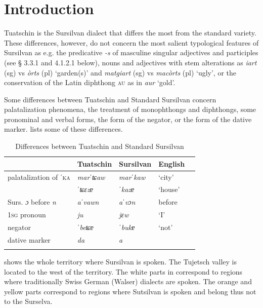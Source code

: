 \chapter{Introduction}
Tuatschin is the Sursilvan dialect that differs the most from the standard variety. These differences, however, do not concern the most salient typological features of Sursilvan as e.g. the predicative \textit{-s} of masculine singular adjectives and participles (see § 3.3.1 and 4.1.2.1 below), nouns and adjectives with stem alterations as \textit{iart} (sg) vs \textit{òrts} (pl) `garden(s)' and \textit{matgiart} (sg) vs \textit{macòrts} (pl) `ugly', or the conservation of the Latin diphthong \textsc{au} as in \textit{aur} `gold'.

Some differences between Tuatschin and Standard Sursilvan concern palatalization phenomena, the treatment of monophthongs and diphthongs, some pronominal and verbal forms, the form of the negator, or the form of the dative marker.  lists some of these differences.


\begin{table}
	\caption{Differences between Tuatschin and Standard Sursilvan}
	\label{difstand}
	\begin{tabular}{lllll}
		\lsptoprule
		& Tuatschin &  Sursilvan & English\\
		\midrule
	palatalization of ˈ\textsc{ka}  & \textit{marˈʨaw} & \textit{marˈkaw} & `city'\\
	& \textit{ˈʨɛzɐ} & \textit{ˈkazɐ} & `house'\\
	Surs. \textit{ɔ} before \textit{n} & \textit{aˈvawn} & \textit{aˈvɔn} & before\\
	\textsc{1sg} pronoun & \textit{ju} & \textit{jɛw} & `I'\\
	negator	& \textit{ˈbeʨɐ} &  \textit{ˈbukɐ} & `not'\\
	dative marker & \textit{da} &  \textit{a}\\
				\lspbottomrule
	\end{tabular}
\end{table}


 shows the whole territory where Sursilvan is spoken. The Tujetsch valley is located to the west of the territory. The white parts in  correspond to regions where traditionally Swiss German (Walser) dialects are spoken. The orange and yellow parts correspond to regions where Sutsilvan is spoken and belong thus not to the Surselva.

